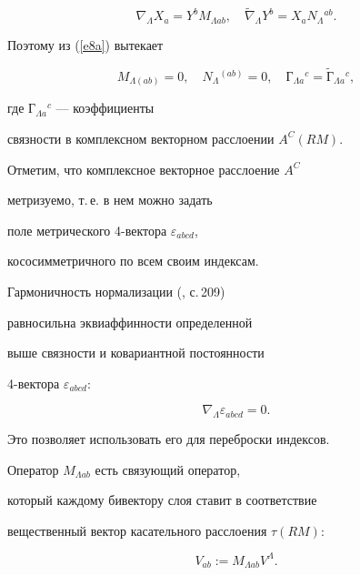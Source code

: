 \begin{equation}


\label{e10a}


\nabla_\Lambda X_a = Y^b M_{\Lambda ab},\quad


\widetilde \nabla_\Lambda Y^b = X_a N_\Lambda{}^{ab}.


\end{equation}


Поэтому из (\ref{e8a}) вытекает


\begin{equation}


\label{e11a}


M_{\Lambda (ab)}=0,\quad N_\Lambda{}^{(ab)}=0,\quad


Г_{\Lambda a}{}^c=\widetilde Г_{\Lambda a}{}^c,


\end{equation}


где $Г_{\Lambda a}{}^c$ --- коэффициенты


связности в комплексном векторном расслоении $A^C(RM)$.


Отметим, что комплексное векторное расслоение $A^C$


метризуемо, т.\,е. в нем можно задать


поле метрического 4-вектора $\varepsilon_{abcd}$,


кососимметричного по всем своим индексам.


Гармоничность нормализации (\cite{5}, с.\,209)


равносильна эквиаффинности определенной


выше связности и ковариантной постоянности


4-вектора $\varepsilon_{abcd}$:


\begin{equation}


\label{e11aa}


\nabla_\Lambda \varepsilon_{abcd}=0.


\end{equation}


Это позволяет использовать его для переброски индексов.


Оператор $M_{\Lambda ab}$ есть связующий оператор,


который каждому бивектору слоя ставит в соответствие


вещественный вектор касательного расслоения $\tau (RM)$:


\begin{equation}


\label{e12a}


V_{ab}:=M_{\Lambda ab}V^\Lambda.


\end{equation}



